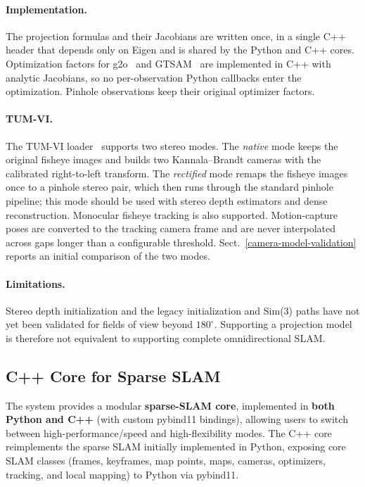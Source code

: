 \documentclass{article}
\let\oldparagraph\paragraph
\renewcommand{\paragraph}[1]{\oldparagraph{#1}\mbox{}}
\begin{document}
\paragraph{Implementation.} The projection formulas and their Jacobians are written once, in a single C++ header that depends only on Eigen and is shared by the Python and C++ cores. Optimization factors for g2o~\cite{g2o_kummerle} and GTSAM~\cite{factor_graphs_for_robot_perception} are implemented in C++ with analytic Jacobians, so no per-observation Python callbacks enter the optimization. Pinhole observations keep their original optimizer factors.

\paragraph{TUM-VI.} The TUM-VI loader~\cite{schubert2018tumvi} supports two stereo modes. The \textit{native} mode keeps the original fisheye images and builds two Kannala--Brandt cameras with the calibrated right-to-left transform. The \textit{rectified} mode remaps the fisheye images once to a pinhole stereo pair, which then runs through the standard pinhole pipeline; this mode should be used with stereo depth estimators and dense reconstruction. Monocular fisheye tracking is also supported. Motion-capture poses are converted to the tracking camera frame and are never interpolated across gaps longer than a configurable threshold. Sect.~\ref{camera-model-validation} reports an initial comparison of the two modes.

\paragraph{Limitations.} Stereo depth initialization and the legacy initialization and Sim(3) paths have not yet been validated for fields of view beyond $180^\circ$. Supporting a projection model is therefore not equivalent to supporting complete omnidirectional SLAM.

\hypertarget{cpp-core}{%
\subsection{C++ Core for Sparse SLAM}\label{cpp-core}}

The system provides a modular \textbf{sparse-SLAM core}, implemented in \textbf{both Python and C++} (with custom pybind11 bindings), allowing users to switch between high-performance/speed and high-flexibility modes. The C++ core reimplements the sparse SLAM initially implemented in Python, exposing core SLAM classes (frames, keyframes, map points, maps, cameras, optimizers, tracking, and local mapping) to Python via pybind11.
\end{document}
